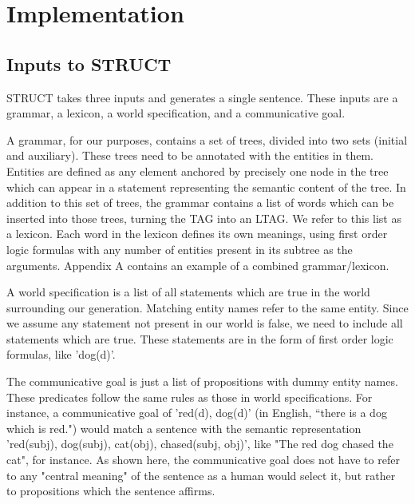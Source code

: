 \section{Implementation}

\subsection{Inputs to STRUCT}

STRUCT takes three inputs and generates a single sentence.  These inputs are a grammar,
a lexicon, a world specification, and a communicative goal.

A grammar, for our purposes, contains a set of trees, divided into two sets (initial and auxiliary).
These trees need to be annotated with the entities in them.  Entities are defined as any element
anchored by precisely one node in the tree which can appear in a statement representing the
semantic content of the tree.  In addition to this set of trees, the grammar contains a list of
words which can be inserted into those trees, turning the TAG into an LTAG.  We refer to this
list as a lexicon.  Each word in the lexicon defines its own meanings, using first order logic
formulas with any number of entities present in its subtree as the arguments.
Appendix A contains an example of a combined grammar/lexicon.

A world specification is a list of all statements which are true in the world surrounding our generation.
Matching entity names refer to the same entity.  Since we assume any statement not present
in our world is false, we need to include all statements which are true.  These statements are in
the form of first order logic formulas, like 'dog(d)'.

The communicative goal is just a list of propositions with dummy entity names.
These predicates follow the same rules as those in world specifications.
For instance, a communicative goal of 'red(d), dog(d)' (in English, ``there is a dog
which is red.") would match a sentence 
with the semantic representation 'red(subj), dog(subj), cat(obj), chased(subj, obj)',
like "The red dog chased the cat", for instance.
As shown here, the communicative goal does not have to refer to any "central meaning" of the sentence as a human would select it, but rather
to propositions which the sentence affirms.

